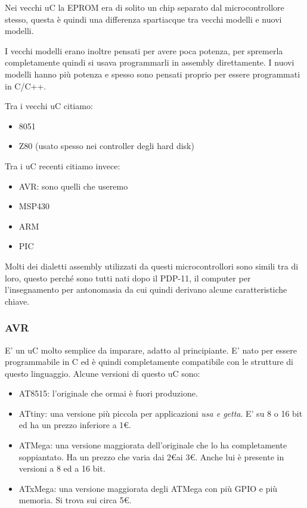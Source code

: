 Nei vecchi uC la EPROM era di solito un chip separato dal microcontrollore stesso, questa è quindi una differenza spartiacque tra vecchi modelli e nuovi modelli.

I vecchi modelli erano inoltre pensati per avere poca potenza, per spremerla completamente quindi si usava programmarli in assembly direttamente. I nuovi modelli hanno più potenza e spesso sono pensati proprio per essere programmati in C/C++.

Tra i vecchi uC citiamo:
\begin{itemize}
    \item 8051
    \item Z80 (usato spesso nei controller degli hard disk)
\end{itemize}

Tra i uC recenti citiamo invece:
\begin{itemize}
    \item AVR: sono quelli che useremo
    \item MSP430
    \item ARM
    \item PIC
\end{itemize}

Molti dei dialetti assembly utilizzati da questi microcontrollori sono simili tra di loro, questo perché sono tutti nati dopo il PDP-11, il computer per l'insegnamento per antonomasia da cui quindi derivano alcune caratteristiche chiave.

\subsubsection{AVR}
E' un uC molto semplice da imparare, adatto al principiante. E' nato per essere programmabile in C ed è quindi completamente compatibile con le strutture di questo linguaggio.
Alcune versioni di questo uC sono:
\begin{itemize}
    \item AT8515: l'originale che ormai è fuori produzione.
    \item ATtiny: una versione più piccola per applicazioni \emph{usa e getta}. E' su 8 o 16 bit ed ha un prezzo inferiore a 1\euro.
    \item ATMega: una versione maggiorata dell'originale che lo ha completamente soppiantato. Ha un prezzo che varia dai 2\euro ai 3\euro. Anche lui è presente in versioni a 8 ed a 16 bit.
    \item ATxMega: una versione maggiorata degli ATMega con più GPIO e più memoria. Si trova sui circa 5\euro.
\end{itemize}

